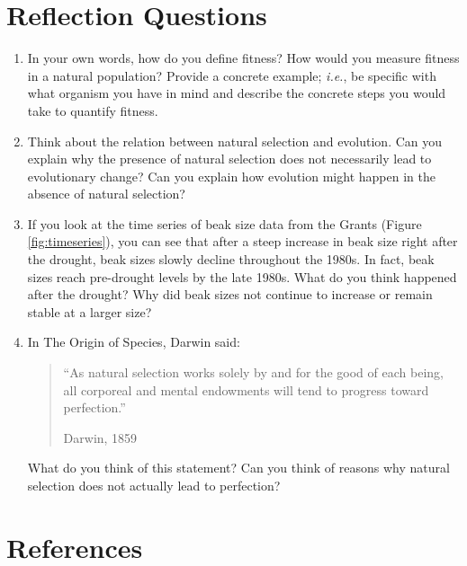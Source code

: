 \documentclass[
]{book}
\begin{document}
\hypertarget{reflection-questions-2}{%
\section{Reflection Questions}\label{reflection-questions-2}}

\begin{enumerate}
\def\labelenumi{\arabic{enumi}.}
\item
  In your own words, how do you define fitness? How would you measure fitness in a natural population? Provide a concrete example; \emph{i.e.}, be specific with what organism you have in mind and describe the concrete steps you would take to quantify fitness.
\item
  Think about the relation between natural selection and evolution. Can you explain why the presence of natural selection does not necessarily lead to evolutionary change? Can you explain how evolution might happen in the absence of natural selection?
\item
  If you look at the time series of beak size data from the Grants (Figure \ref{fig:timeseries}), you can see that after a steep increase in beak size right after the drought, beak sizes slowly decline throughout the 1980s. In fact, beak sizes reach pre-drought levels by the late 1980s. What do you think happened after the drought? Why did beak sizes not continue to increase or remain stable at a larger size?
\item
  In The Origin of Species, Darwin said:

  \begin{quote}
  ``As natural selection works solely by and for the good of each being, all corporeal and mental endowments will tend to progress toward perfection.''

  Darwin, 1859
  \end{quote}

  What do you think of this statement? Can you think of reasons why natural selection does not actually lead to perfection?
\end{enumerate}

\hypertarget{references-3}{%
\section{References}\label{references-3}}
\end{document}

